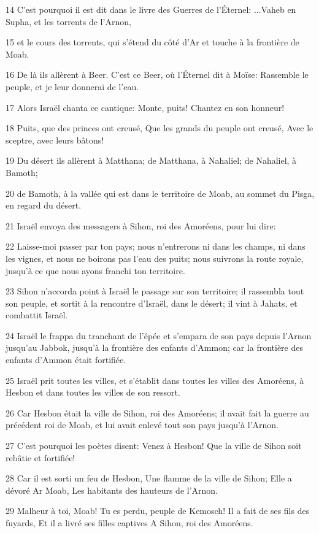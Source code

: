 \par 14 C'est pourquoi il est dit dans le livre des Guerres de l'Éternel: ...Vaheb en Supha, et les torrents de l'Arnon,
\par 15 et le cours des torrents, qui s'étend du côté d'Ar et touche à la frontière de Moab.
\par 16 De là ils allèrent à Beer. C'est ce Beer, où l'Éternel dit à Moïse: Rassemble le peuple, et je leur donnerai de l'eau.
\par 17 Alors Israël chanta ce cantique: Monte, puits! Chantez en son honneur!
\par 18 Puits, que des princes ont creusé, Que les grands du peuple ont creusé, Avec le sceptre, avec leurs bâtons!
\par 19 Du désert ils allèrent à Matthana; de Matthana, à Nahaliel; de Nahaliel, à Bamoth;
\par 20 de Bamoth, à la vallée qui est dans le territoire de Moab, au sommet du Pisga, en regard du désert.
\par 21 Israël envoya des messagers à Sihon, roi des Amoréens, pour lui dire:
\par 22 Laisse-moi passer par ton pays; nous n'entrerons ni dans les champs, ni dans les vignes, et nous ne boirons pas l'eau des puits; nous suivrons la route royale, jusqu'à ce que nous ayons franchi ton territoire.
\par 23 Sihon n'accorda point à Israël le passage sur son territoire; il rassembla tout son peuple, et sortit à la rencontre d'Israël, dans le désert; il vint à Jahats, et combattit Israël.
\par 24 Israël le frappa du tranchant de l'épée et s'empara de son pays depuis l'Arnon jusqu'au Jabbok, jusqu'à la frontière des enfants d'Ammon; car la frontière des enfants d'Ammon était fortifiée.
\par 25 Israël prit toutes les villes, et s'établit dans toutes les villes des Amoréens, à Hesbon et dans toutes les villes de son ressort.
\par 26 Car Hesbon était la ville de Sihon, roi des Amoréens; il avait fait la guerre au précédent roi de Moab, et lui avait enlevé tout son pays jusqu'à l'Arnon.
\par 27 C'est pourquoi les poètes disent: Venez à Hesbon! Que la ville de Sihon soit rebâtie et fortifiée!
\par 28 Car il est sorti un feu de Hesbon, Une flamme de la ville de Sihon; Elle a dévoré Ar Moab, Les habitants des hauteurs de l'Arnon.
\par 29 Malheur à toi, Moab! Tu es perdu, peuple de Kemosch! Il a fait de ses fils des fuyards, Et il a livré ses filles captives A Sihon, roi des Amoréens.
